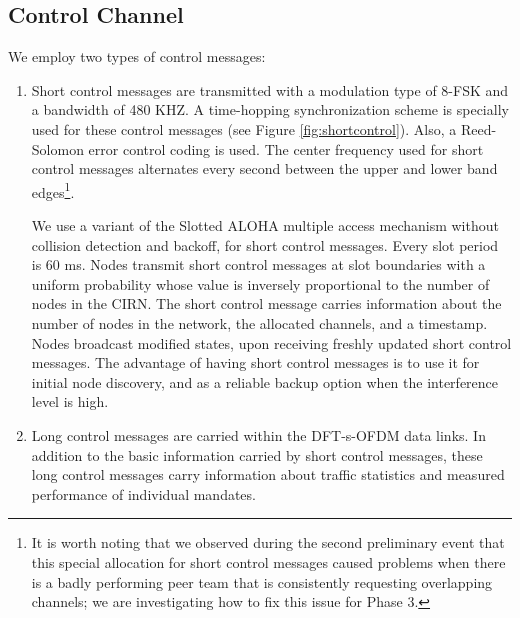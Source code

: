 \documentclass[11pt]{article}
\begin{document}
\subsection{Control Channel}\label{sec:control}
We employ two types of control messages:
\begin{enumerate}
    \item Short control messages are transmitted with a modulation type of 8-FSK and a bandwidth of 480 KHZ. A time-hopping synchronization scheme is specially used for these control messages (see Figure \ref{fig:shortcontrol}). Also, a Reed-Solomon error control coding is used. The center frequency used for short control messages alternates every second between the upper and lower band edges\footnote{It is worth noting that we observed during the second preliminary event that this special allocation for short control messages caused problems when there is a badly performing peer team that is consistently requesting overlapping channels; we are investigating how to fix this issue for Phase 3.}.
    
    We use a variant of the Slotted ALOHA multiple access mechanism without collision detection and backoff, for short control messages. Every slot period is 60 ms. Nodes transmit short control messages at slot boundaries with a uniform probability whose value is inversely proportional to the number of nodes in the CIRN. The short control message carries information about the number of nodes in the network, the allocated channels, and a timestamp. Nodes broadcast modified states, upon receiving freshly updated short control messages. The advantage of having short control messages is to use it for initial node discovery, and as a reliable backup option when the interference level is high.
    
    \item Long control messages are carried within the DFT-s-OFDM data links. In addition to the basic information carried by short control messages, these long control messages carry information about traffic statistics and measured performance of individual mandates.
\end{enumerate}
\end{document}
